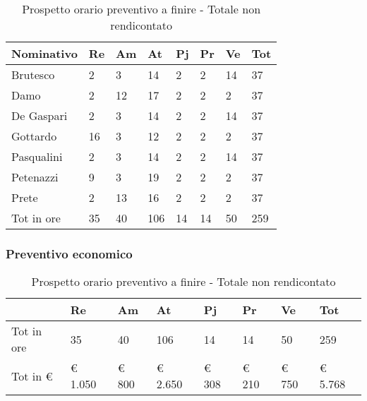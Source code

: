 							\begin{table}[H] \begin{center} \begin{tabular}{llllllll}
							\toprule
							\textbf{Nominativo}	&	\textbf{Re}	&	\textbf{Am}	&	\textbf{At}	&	\textbf{Pj}	&	\textbf{Pr}	&	\textbf{Ve}	&	\textbf{Tot}	 \\
							\midrule
							Brutesco	&	2	&	3	&	14	&	2	&	2	&	14	&	37	 \\
							Damo		&	2	&	12	&	17	&	2	&	2	&	2	&	37	 \\
							De Gaspari	&	2	&	3	&	14	&	2	&	2	&	14	&	37	 \\
							Gottardo	&	16	&	3	&	12	&	2	&	2	&	2	&	37	 \\
							Pasqualini	&	2	&	3	&	14	&	2	&	2	&	14	&	37	 \\
							Petenazzi	&	9	&	3	&	19	&	2	&	2	&	2	&	37	 \\
							Prete		&	2	&	13	&	16	&	2	&	2	&	2	&	37	 \\
							\midrule
							Tot in ore	&	35	&	40	&	106	&	14	&	14	&	50	&	259	 \\
							\bottomrule
							\end{tabular} \end{center} \caption{Prospetto orario preventivo a finire -
							Totale non rendicontato
							} \end{table}

		\subsubsection{Preventivo economico}

			\begin{table}[H] \begin{center} \begin{tabular}{llllllll}
			\toprule
				&	\textbf{Re}	&	\textbf{Am}	&	\textbf{At}	&	\textbf{Pj}	&	\textbf{Pr}	&	\textbf{Ve}	&	\textbf{Tot}	 \\
			\midrule
			Tot in ore	&	35	&	40	&	106	&	14	&	14	&	50	&	259	 \\


			Tot in €	&	 €        1.050 	 & 	 €        800 	 & 	 €        2.650 	 & 	 €        308 	 & 	 €            210 	 & 	 €        750 	 & 	 €              5.768 	 \\
			\bottomrule
			\end{tabular} \end{center}
			\caption{Prospetto orario preventivo a finire - Totale non rendicontato
			} \end{table}

